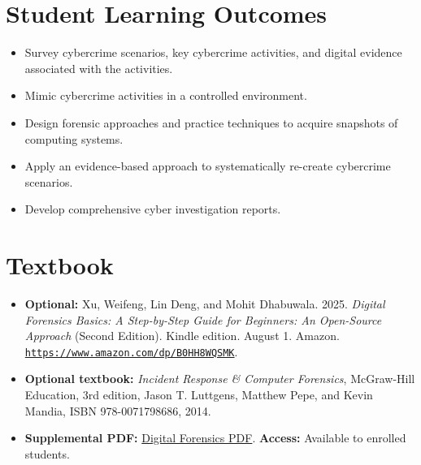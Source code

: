 \documentclass[10pt]{article}
\begin{document}
\section{Student Learning Outcomes}
\begin{itemize}
  \item Survey cybercrime scenarios, key cybercrime activities, and digital evidence associated with the activities.
  \item Mimic cybercrime activities in a controlled environment.
  \item Design forensic approaches and practice techniques to acquire snapshots of computing systems.
  \item Apply an evidence-based approach to systematically re-create cybercrime scenarios.
  \item Develop comprehensive cyber investigation reports.
\end{itemize}

\section{Textbook}
\begin{itemize}
  \item \textbf{Optional:} Xu, Weifeng, Lin Deng, and Mohit Dhabuwala. 2025. \emph{Digital Forensics Basics: A Step-by-Step Guide for Beginners: An Open-Source Approach} (Second Edition). Kindle edition. August 1. Amazon. \href{https://www.amazon.com/dp/B0HH8WQSMK}{\nolinkurl{https://www.amazon.com/dp/B0HH8WQSMK}}.
  \item \textbf{Optional textbook:} \emph{Incident Response \& Computer Forensics}, McGraw-Hill Education, 3rd edition, Jason T. Luttgens, Matthew Pepe, and Kevin Mandia, ISBN 978-0071798686, 2014.
  \item \textbf{Supplemental PDF:} \href{https://github.com/frankwxu/digital-forensics-lab/blob/main/papers/books/Digital_Forensics_Andriod.pdf}{Digital Forensics PDF}. \textbf{Access:} Available to enrolled students.
\end{itemize}

\end{document}
